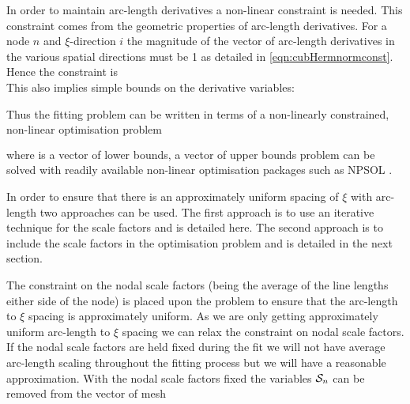 In order to maintain arc-length derivatives a non-linear constraint is needed.
This constraint comes from the geometric properties of arc-length derivatives.
For a node $n$ and $\xi$-direction $i$ the magnitude of the vector of
arc-length derivatives in the various spatial directions must be 1 as detailed
in \eqref{eqn:cubHermnormconst}.  Hence the constraint is
\begin{equation}
  \label{eqn:normconst}
\end{equation}
This also implies simple bounds on the derivative variables:

Thus the fitting problem can be written in terms of a non-linearly constrained,
non-linear optimisation problem
\begin{eqnarray}
  \label{eqn:nloproblem} \\
\end{eqnarray}
where  is a vector of lower bounds,  a vector of upper bounds 
problem can be solved with readily available non-linear optimisation packages 
such as NPSOL \citep{gill:1986}. 

In order to ensure that there is an approximately uniform spacing of $\xi$
with arc-length two approaches can be used. The first approach is to use
an iterative technique for the scale factors and is detailed here. The
second approach is to include the scale factors in the optimisation problem
and is detailed in the next section.

The constraint on the nodal scale factors (being the average of the line
lengths either side of the node) is placed upon the problem to ensure that the
arc-length to $\xi$ spacing is approximately uniform. As we are only getting
approximately uniform arc-length to $\xi$ spacing we can relax the constraint
on nodal scale factors. If the nodal scale factors are held fixed during the
fit we will not have average arc-length scaling throughout the fitting process
but we will have a reasonable approximation. With the nodal scale factors
fixed the variables ${\cal S}_{n}$ can be removed from the vector of mesh

